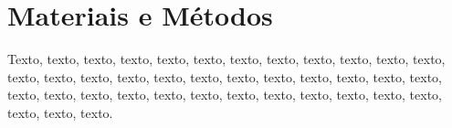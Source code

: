 \chapter{Materiais e Métodos}

Texto, texto, texto, texto, texto, texto, texto, texto, texto, texto, texto, texto, texto, texto, texto, texto, texto, texto, texto, texto, texto, texto, texto, texto, texto, texto, texto, texto, texto, texto, texto, texto, texto, texto, texto, texto, texto, texto, texto.